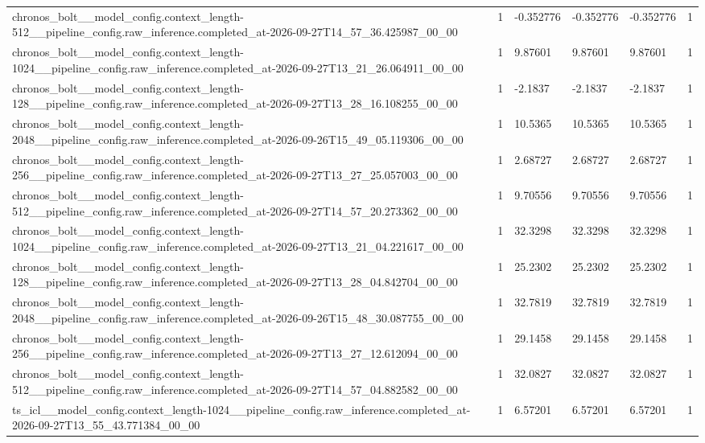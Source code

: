 \begin{tabular}{llllll}
chronos\_bolt\_\_model\_config.context\_length-512\_\_pipeline\_config.raw\_inference.completed\_at-2026-09-27T14\_57\_36.425987\_00\_00 & 1 & -0.352776 & -0.352776 & -0.352776 & 1 \\
chronos\_bolt\_\_model\_config.context\_length-1024\_\_pipeline\_config.raw\_inference.completed\_at-2026-09-27T13\_21\_26.064911\_00\_00 & 1 & 9.87601 & 9.87601 & 9.87601 & 1 \\
chronos\_bolt\_\_model\_config.context\_length-128\_\_pipeline\_config.raw\_inference.completed\_at-2026-09-27T13\_28\_16.108255\_00\_00 & 1 & -2.1837 & -2.1837 & -2.1837 & 1 \\
chronos\_bolt\_\_model\_config.context\_length-2048\_\_pipeline\_config.raw\_inference.completed\_at-2026-09-26T15\_49\_05.119306\_00\_00 & 1 & 10.5365 & 10.5365 & 10.5365 & 1 \\
chronos\_bolt\_\_model\_config.context\_length-256\_\_pipeline\_config.raw\_inference.completed\_at-2026-09-27T13\_27\_25.057003\_00\_00 & 1 & 2.68727 & 2.68727 & 2.68727 & 1 \\
chronos\_bolt\_\_model\_config.context\_length-512\_\_pipeline\_config.raw\_inference.completed\_at-2026-09-27T14\_57\_20.273362\_00\_00 & 1 & 9.70556 & 9.70556 & 9.70556 & 1 \\
chronos\_bolt\_\_model\_config.context\_length-1024\_\_pipeline\_config.raw\_inference.completed\_at-2026-09-27T13\_21\_04.221617\_00\_00 & 1 & 32.3298 & 32.3298 & 32.3298 & 1 \\
chronos\_bolt\_\_model\_config.context\_length-128\_\_pipeline\_config.raw\_inference.completed\_at-2026-09-27T13\_28\_04.842704\_00\_00 & 1 & 25.2302 & 25.2302 & 25.2302 & 1 \\
chronos\_bolt\_\_model\_config.context\_length-2048\_\_pipeline\_config.raw\_inference.completed\_at-2026-09-26T15\_48\_30.087755\_00\_00 & 1 & 32.7819 & 32.7819 & 32.7819 & 1 \\
chronos\_bolt\_\_model\_config.context\_length-256\_\_pipeline\_config.raw\_inference.completed\_at-2026-09-27T13\_27\_12.612094\_00\_00 & 1 & 29.1458 & 29.1458 & 29.1458 & 1 \\
chronos\_bolt\_\_model\_config.context\_length-512\_\_pipeline\_config.raw\_inference.completed\_at-2026-09-27T14\_57\_04.882582\_00\_00 & 1 & 32.0827 & 32.0827 & 32.0827 & 1 \\
ts\_icl\_\_model\_config.context\_length-1024\_\_pipeline\_config.raw\_inference.completed\_at-2026-09-27T13\_55\_43.771384\_00\_00 & 1 & 6.57201 & 6.57201 & 6.57201 & 1 \\

\end{tabular}
